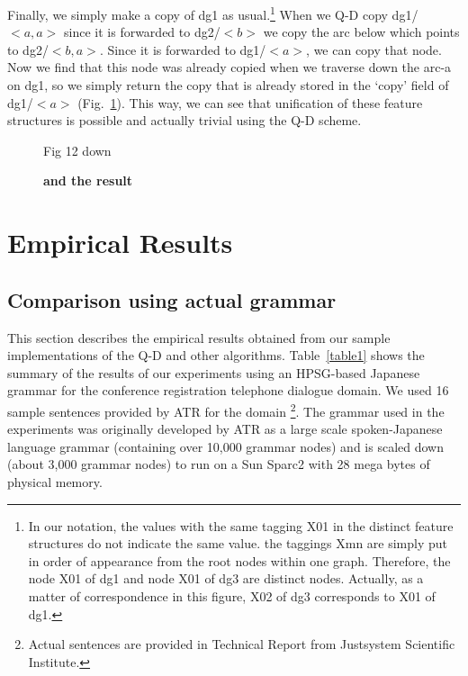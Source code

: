 Finally, we simply make a copy of dg1 as usual.\footnote{In our
notation, the values with the same tagging X01 in the distinct feature
structures do not indicate the same value. the taggings Xmn are simply
put in order of appearance from the root nodes within one graph.
Therefore, the node X01 of dg1 and node X01 of dg3 are distinct nodes. 
Actually, as a matter of correspondence in this figure, X02 of dg3
corresponds to X01 of dg1.} When we Q-D copy dg1/$<a,a>$ since it is
forwarded to dg2/$<b>$ we copy the arc below which points to
dg2/$<b,a>$. Since it is forwarded to dg1/$<a>$, we can copy that
node. Now we find that this node was already copied when we traverse
down the arc-a on dg1, so we simply return the copy that is already
stored in the `copy' field of dg1/$<a>$ (Fig.~\ref{figure16}). This
way, we can see that unification of these feature structures is
possible and actually trivial using the Q-D scheme.


\begin{figure}[htb]
\epsfxsize 140mm
\epsfysize 200mm
\vspace*{2.5cm}
\hspace*{5cm}
\vspace*{2cm}
\hspace*{12cm} Fig 12 down
\vspace*{2cm}
\caption{{\bf and the result}}
\label{figure16}
\end{figure}

\section{Empirical Results}
\subsection{Comparison using actual grammar}

This section describes the empirical results obtained from our sample
implementations of the Q-D and other algorithms.  Table~\ref{table1}
shows the summary of the results of our experiments using an
HPSG-based Japanese grammar for the conference registration telephone
dialogue domain.  We used 16 sample sentences provided by ATR for the
domain \footnote{Actual sentences are provided in Technical Report
  from Justsystem Scientific Institute.}.  The grammar used in the
experiments was originally developed by ATR as a large scale
spoken-Japanese language grammar (containing over 10,000 grammar
nodes) and is scaled down (about 3,000 grammar nodes) to run on a Sun
Sparc2 with 28 mega bytes of physical memory.

